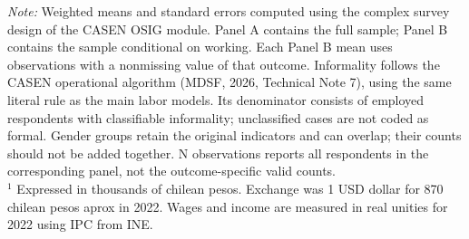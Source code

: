 \begin{table}[htbp]
\vspace{1ex}
\raggedright
\footnotesize\textit{Note:} Weighted means and standard errors computed using the complex survey design of the CASEN OSIG module. Panel A contains the full sample; Panel B contains the sample conditional on working. Each Panel B mean uses observations with a nonmissing value of that outcome. Informality follows the CASEN operational algorithm (MDSF, 2026, Technical Note 7), using the same literal rule as the main labor models. Its denominator consists of employed respondents with classifiable informality; unclassified cases are not coded as formal. Gender groups retain the original indicators and can overlap; their counts should not be added together. N observations reports all respondents in the corresponding panel, not the outcome-specific valid counts. \\
$^1$ Expressed in thousands of chilean pesos. Exchange was 1 USD dollar for 870 chilean pesos aprox in 2022. Wages and income are measured in real unities for 2022 using IPC from INE.
\end{table}
